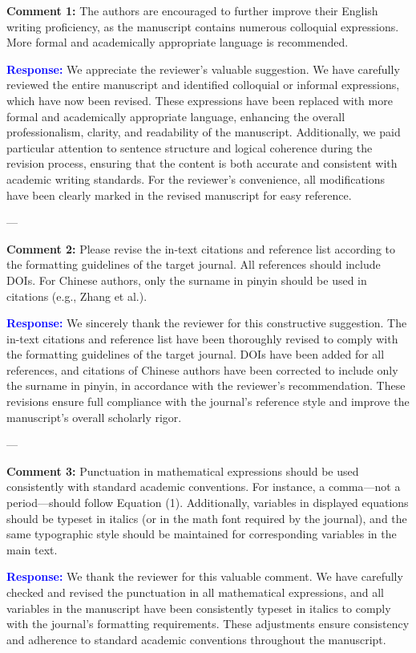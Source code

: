\documentclass[12pt]{article}
\begin{document}
\textbf{Comment 1:}  
The authors are encouraged to further improve their English writing proficiency, as the manuscript contains numerous colloquial expressions. More formal and academically appropriate language is recommended.

\textcolor{blue}{\textbf{Response:}} 
We appreciate the reviewer’s valuable suggestion. We have carefully reviewed the entire manuscript and identified colloquial or informal expressions, which have now been revised. These expressions have been replaced with more formal and academically appropriate language, enhancing the overall professionalism, clarity, and readability of the manuscript. Additionally, we paid particular attention to sentence structure and logical coherence during the revision process, ensuring that the content is both accurate and consistent with academic writing standards. For the reviewer’s convenience, all modifications have been clearly marked in the revised manuscript for easy reference.

---

\textbf{Comment 2:}  
Please revise the in-text citations and reference list according to the formatting guidelines of the target journal. All references should include DOIs. For Chinese authors, only the surname in pinyin should be used in citations (e.g., Zhang et al.).

\textcolor{blue}{\textbf{Response:}} 
We sincerely thank the reviewer for this constructive suggestion. The in-text citations and reference list have been thoroughly revised to comply with the formatting guidelines of the target journal. DOIs have been added for all references, and citations of Chinese authors have been corrected to include only the surname in pinyin, in accordance with the reviewer’s recommendation. These revisions ensure full compliance with the journal’s reference style and improve the manuscript’s overall scholarly rigor.

---

\textbf{Comment 3:}  
Punctuation in mathematical expressions should be used consistently with standard academic conventions. For instance, a comma—not a period—should follow Equation (1). Additionally, variables in displayed equations should be typeset in italics (or in the math font required by the journal), and the same typographic style should be maintained for corresponding variables in the main text.

\textcolor{blue}{\textbf{Response:}} 
We thank the reviewer for this valuable comment. We have carefully checked and revised the punctuation in all mathematical expressions, and all variables in the manuscript have been consistently typeset in italics to comply with the journal’s formatting requirements. These adjustments ensure consistency and adherence to standard academic conventions throughout the manuscript.
\end{document}
